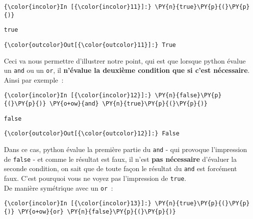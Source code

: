     \begin{Verbatim}[commandchars=\\\{\}]
{\color{incolor}In [{\color{incolor}11}]:} \PY{n}{true}\PY{p}{(}\PY{p}{)}
\end{Verbatim}


    \begin{Verbatim}[commandchars=\\\{\}]
true

    \end{Verbatim}

\begin{Verbatim}[commandchars=\\\{\}]
{\color{outcolor}Out[{\color{outcolor}11}]:} True
\end{Verbatim}
            
    Ceci va nous permettre d'illustrer notre point, qui est que lorsque
python évalue un \texttt{and} ou un \texttt{or}, il \textbf{n'évalue la
deuxième condition que si c'est nécessaire}. Ainsi par exemple~:

    \begin{Verbatim}[commandchars=\\\{\}]
{\color{incolor}In [{\color{incolor}12}]:} \PY{n}{false}\PY{p}{(}\PY{p}{)} \PY{o+ow}{and} \PY{n}{true}\PY{p}{(}\PY{p}{)}
\end{Verbatim}


    \begin{Verbatim}[commandchars=\\\{\}]
false

    \end{Verbatim}

\begin{Verbatim}[commandchars=\\\{\}]
{\color{outcolor}Out[{\color{outcolor}12}]:} False
\end{Verbatim}
            
    Dans ce cas, python évalue la première partie du \texttt{and} - qui
provoque l'impression de \texttt{false} - et comme le résultat est faux,
il n'est \textbf{pas nécessaire} d'évaluer la seconde condition, on sait
que de toute façon le résultat du \texttt{and} est forcément faux. C'est
pourquoi vous ne voyez pas l'impression de \texttt{true}.\\

    De manière symétrique avec un \texttt{or}~:

    \begin{Verbatim}[commandchars=\\\{\}]
{\color{incolor}In [{\color{incolor}13}]:} \PY{n}{true}\PY{p}{(}\PY{p}{)} \PY{o+ow}{or} \PY{n}{false}\PY{p}{(}\PY{p}{)}
\end{Verbatim}


